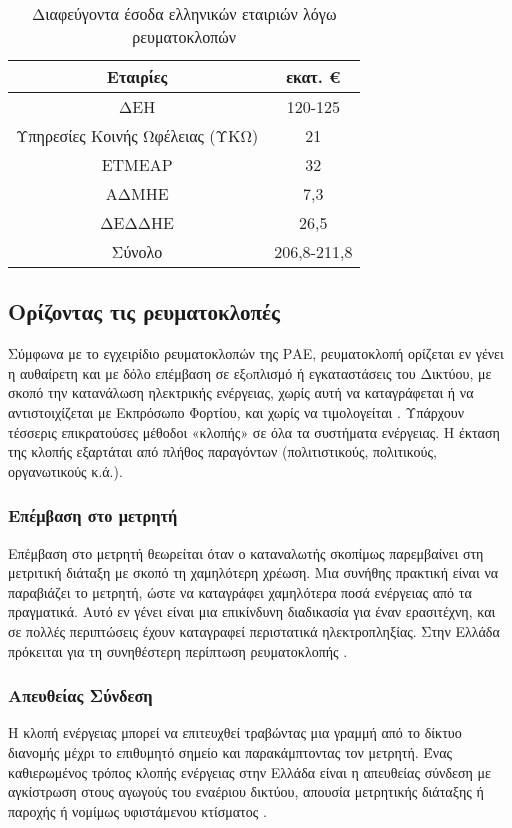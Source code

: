 \begin{table}[ht!]
\centering
\begin{tabular}{ |c||c|  }
 \hline
 Εταιρίες & εκατ. \euro\\
 \hline
 ΔΕΗ & 120-125\\
 Υπηρεσίες Κοινής Ωφέλειας (ΥΚΩ) & 21\\
 ΕΤΜΕΑΡ & 32\\
 ΑΔΜΗΕ & 7,3\\
 ΔΕΔΔΗΕ & 26,5\\
 \hline
 Σύνολο& 206,8-211,8\\
 \hline
\end{tabular}
\caption{Διαφεύγοντα έσοδα ελληνικών εταιριών λόγω ρευματοκλοπών}
\label{tab:lostearnings}
\end{table}
\subsection{Ορίζοντας τις ρευματοκλοπές}
Σύμφωνα με το εγχειρίδιο ρευματοκλοπών της ΡΑΕ, ρευματοκλοπή ορίζεται εν γένει η αυθαίρετη και με δόλο επέμβαση σε εξoπλισμό ή εγκαταστάσεις του Δικτύου, με σκοπό την κατανάλωση ηλεκτρικής ενέργειας, χωρίς αυτή να καταγράφεται ή να αντιστοιχίζεται με Εκπρόσωπο Φορτίου, και χωρίς να τιμολογείται \cite{rae}. Υπάρχουν τέσσερις επικρατούσες μέθοδοι «κλοπής» σε όλα τα συστήματα ενέργειας. Η έκταση της κλοπής εξαρτάται από πλήθος παραγόντων (πολιτιστικούς, πολιτικούς, οργανωτικούς κ.ά.). 

\subsubsection{Επέμβαση στο μετρητή}
Επέμβαση στο μετρητή θεωρείται όταν ο καταναλωτής σκοπίμως παρεμβαίνει στη μετριτική διάταξη με σκοπό τη χαμηλότερη χρέωση. Μια συνήθης πρακτική είναι να παραβιάζει το μετρητή, ώστε να καταγράφει χαμηλότερα ποσά ενέργειας από τα πραγματικά. Αυτό εν γένει είναι μια  επικίνδυνη διαδικασία για έναν ερασιτέχνη, και σε πολλές περιπτώσεις έχουν καταγραφεί περιστατικά ηλεκτροπληξίας. Στην Ελλάδα πρόκειται για τη συνηθέστερη περίπτωση ρευματοκλοπής \cite{rae}.
\subsubsection{Απευθείας Σύνδεση}
Η κλοπή ενέργειας μπορεί να επιτευχθεί τραβώντας μια γραμμή από το δίκτυο διανομής μέχρι το επιθυμητό σημείο και παρακάμπτοντας τον μετρητή. Ένας καθιερωμένος τρόπος κλοπής ενέργειας στην Ελλάδα είναι η απευθείας σύνδεση με αγκίστρωση στους αγωγούς του εναέριου δικτύου, απουσία μετρητικής διάταξης ή παροχής ή νομίμως υφιστάμενου κτίσματος \cite{rae}.
